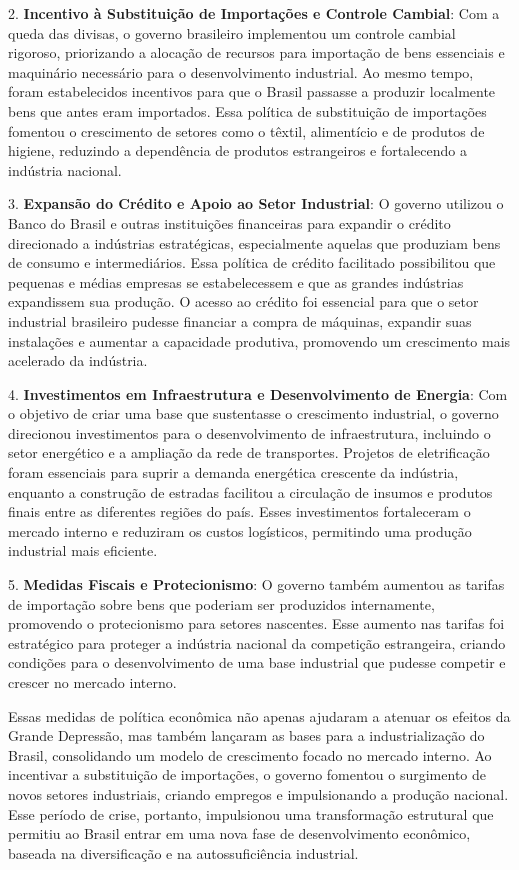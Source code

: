 \documentclass[a4paper,12pt]{article}[abntex2]
\begin{document}
2. \textbf{Incentivo à Substituição de Importações e Controle Cambial}: Com a queda das divisas, o governo brasileiro implementou um controle cambial rigoroso, priorizando a alocação de recursos para importação de bens essenciais e maquinário necessário para o desenvolvimento industrial. Ao mesmo tempo, foram estabelecidos incentivos para que o Brasil passasse a produzir localmente bens que antes eram importados. Essa política de substituição de importações fomentou o crescimento de setores como o têxtil, alimentício e de produtos de higiene, reduzindo a dependência de produtos estrangeiros e fortalecendo a indústria nacional.

3. \textbf{Expansão do Crédito e Apoio ao Setor Industrial}: O governo utilizou o Banco do Brasil e outras instituições financeiras para expandir o crédito direcionado a indústrias estratégicas, especialmente aquelas que produziam bens de consumo e intermediários. Essa política de crédito facilitado possibilitou que pequenas e médias empresas se estabelecessem e que as grandes indústrias expandissem sua produção. O acesso ao crédito foi essencial para que o setor industrial brasileiro pudesse financiar a compra de máquinas, expandir suas instalações e aumentar a capacidade produtiva, promovendo um crescimento mais acelerado da indústria.

4. \textbf{Investimentos em Infraestrutura e Desenvolvimento de Energia}: Com o objetivo de criar uma base que sustentasse o crescimento industrial, o governo direcionou investimentos para o desenvolvimento de infraestrutura, incluindo o setor energético e a ampliação da rede de transportes. Projetos de eletrificação foram essenciais para suprir a demanda energética crescente da indústria, enquanto a construção de estradas facilitou a circulação de insumos e produtos finais entre as diferentes regiões do país. Esses investimentos fortaleceram o mercado interno e reduziram os custos logísticos, permitindo uma produção industrial mais eficiente.

5. \textbf{Medidas Fiscais e Protecionismo}: O governo também aumentou as tarifas de importação sobre bens que poderiam ser produzidos internamente, promovendo o protecionismo para setores nascentes. Esse aumento nas tarifas foi estratégico para proteger a indústria nacional da competição estrangeira, criando condições para o desenvolvimento de uma base industrial que pudesse competir e crescer no mercado interno.

Essas medidas de política econômica não apenas ajudaram a atenuar os efeitos da Grande Depressão, mas também lançaram as bases para a industrialização do Brasil, consolidando um modelo de crescimento focado no mercado interno. Ao incentivar a substituição de importações, o governo fomentou o surgimento de novos setores industriais, criando empregos e impulsionando a produção nacional. Esse período de crise, portanto, impulsionou uma transformação estrutural que permitiu ao Brasil entrar em uma nova fase de desenvolvimento econômico, baseada na diversificação e na autossuficiência industrial.
\end{document}
